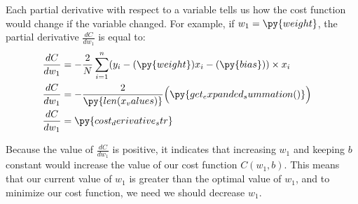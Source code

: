 \documentclass[12pt, demo]{article}
\begin{document}


Each partial derivative with respect to a variable tells us how the cost function would change if the variable changed. For example, if $w_1 = \py{weight}$, the partial derivative $\frac{dC}{dw_1}$ is equal to:
\begin{align*}
	\frac{dC}{dw_1} & = -\frac{2}{N} \sum_{i=1}^{n} (y_i - (\py{weight})x_i - (\py{bias})) \times x_i
	\\
	\frac{dC}{dw_1} & =
	\begin{aligned}[t]
		-\frac{2}{\py{len(x_values)}}
		\Big( & \py{get_expanded_summation()}\Big)
	\end{aligned}
	\\
	\frac{dC}{dw_1} & = \py{cost_derivative_str}
\end{align*}

Because the value of $\frac{dC}{dw_1}$ is positive, it indicates that increasing $w_1$ and keeping $b$ constant would increase the value of our cost function $C(w_1, b)$. This means that our current value of $w_1$ is greater than the optimal value of $w_1$, and to minimize our cost function, we need we should decrease $w_1$.
\end{document}
